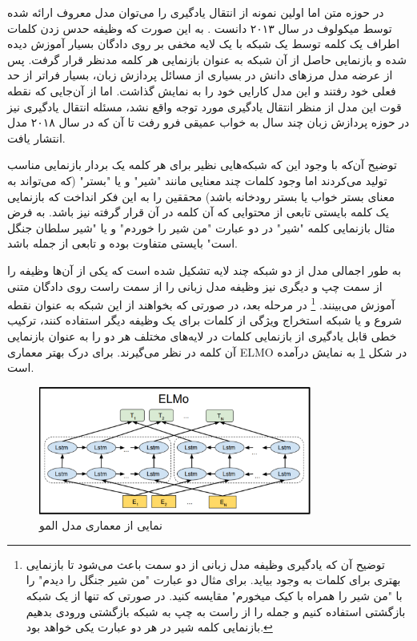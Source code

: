 در حوزه متن اما اولین نمونه از انتقال یادگیری را می‌توان مدل معروف 
 ارائه شده توسط میکولوف در سال ۲۰۱۳ دانست
\cite{word2vec_paper}.
به این صورت که وظیفه حدس زدن کلمات اطراف یک کلمه توسط یک شبکه با یک لایه مخفی بر روی دادگان بسیار آموزش دیده شده و بازنمایی حاصل از آن شبکه به عنوان بازنمایی هر کلمه مدنظر قرار گرفت. پس از عرضه مدل 
مرز‌های دانش در بسیاری از مسائل پردازش زبان، بسیار فراتر از حد فعلی خود رفتند و این مدل کارایی خود را به نمایش گذاشت. اما از آن‌جایی که نقطه قوت این مدل از منظر انتقال یادگیری مورد توجه واقع نشد،‌ مسئله انتقال یادگیری نیز در حوزه پردازش زبان چند سال به خواب عمیقی فرو رفت تا آن که در سال ۲۰۱۸ مدل 
انتشار یافت. 

توضیح آن‌که با وجود این که شبکه‌هایی نظیر 
برای هر کلمه یک بردار بازنمایی مناسب تولید می‌کردند اما وجود کلمات چند معنایی مانند "شیر" و یا "بستر" (که می‌تواند به معنای بستر خواب یا بستر رودخانه باشد) محققین را به این فکر انداخت که بازنمایی یک کلمه بایستی تابعی از محتوایی که آن کلمه در آن قرار گرفته نیز باشد.  به فرض مثال بازنمایی کلمه "شیر" در دو عبارت "من شیر را خوردم" و یا "شیر سلطان جنگل است" بایستی متفاوت بوده و تابعی از جمله باشد. 

به طور اجمالی مدل 
از دو شبکه 
چند لایه تشکیل شده است که یکی از آن‌ها وظیفه 
را از سمت چپ و دیگری نیز وظیفه 
مدل زبانی
را از سمت راست روی دادگان متنی آموزش می‌بینند. 
\footnote{
توضیح آن که یادگیری وظیفه مدل زبانی از دو سمت باعث می‌شود تا بازنمایی بهتری برای کلمات به وجود بیاید. برای مثال دو عبارت "من شیر جنگل را دیدم" را با "من شیر را همراه با کیک میخورم" مقایسه کنید. در صورتی که تنها از یک شبکه بازگشتی استفاده کنیم و جمله را از راست به چپ به شبکه بازگشتی ورودی بدهیم بازنمایی کلمه شیر در هر دو عبارت یکی خواهد بود.
}
در مرحله بعد، در صورتی که بخواهند از این شبکه به عنوان نقطه شروع و یا شبکه استخراج ویژگی از کلمات برای یک وظیفه دیگر استفاده کنند، ترکیب خطی قابل یادگیری از بازنمایی کلمات در لایه‌های مختلف هر دو
را به عنوان بازنمایی آن کلمه در نظر می‌گیرند. برای درک بهتر معماری ELMO در شکل 
\ref{fig:chap3:elmo_arch}
به نمایش درآمده است.

\begin{figure}[h]
	\centering
	\includegraphics[width=0.8\textwidth]{images/chap3/elmo_arch.png}
	\caption{
		نمایی از معماری مدل المو
	}
	\label{fig:chap3:elmo_arch}
\end{figure}

